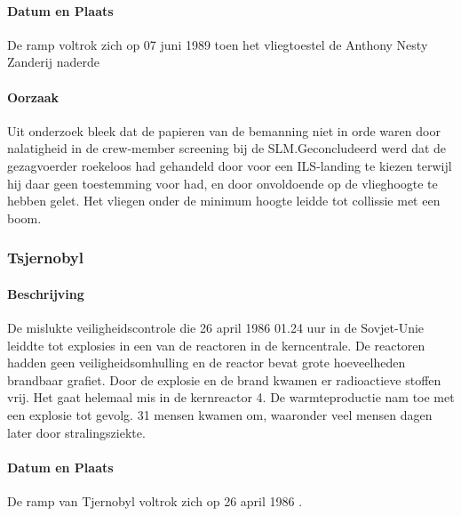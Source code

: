 \documentclass{article}
\begin{document}
	\paragraph{Datum en Plaats}
	De ramp voltrok zich op 07 juni 1989 toen het vliegtoestel de Anthony Nesty Zanderij naderde
	\paragraph{Oorzaak}
	\newline \indent
	
	Uit onderzoek bleek dat de papieren van de bemanning niet in orde waren door nalatigheid in de crew-member screening bij de SLM.Geconcludeerd werd dat de gezagvoerder roekeloos had gehandeld door voor een ILS-landing te kiezen terwijl hij daar geen toestemming voor had, en door onvoldoende op de vlieghoogte te hebben gelet. Het vliegen onder de minimum hoogte leidde tot collissie met een boom.
	\subsubsection{Tsjernobyl}
	\paragraph{Beschrijving}
	De mislukte veiligheidscontrole die 26 april 1986 01.24 uur in de Sovjet-Unie leiddte tot explosies in een van de reactoren in de kerncentrale. De reactoren hadden geen veiligheidsomhulling en de reactor bevat grote hoeveelheden brandbaar grafiet. Door de explosie en de brand kwamen er radioactieve stoffen vrij. Het gaat helemaal mis in de kernreactor 4. De warmteproductie nam  toe met een explosie tot gevolg. 31 mensen kwamen om, waaronder veel mensen dagen later door stralingsziekte.
	\paragraph{Datum en Plaats}
	De ramp van Tjernobyl voltrok zich op 26 april 1986 \cite{INSAVienna1992Chernobyl}.
\end{document}

